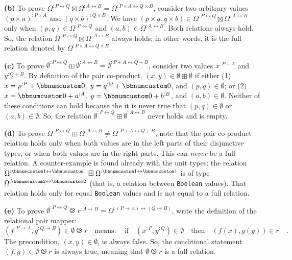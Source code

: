 \textbf{(b)} To prove $\Omega^{:P\leftrightarrow Q}\boxtimes\Omega^{:A\leftrightarrow B}=\Omega^{:P\times A\leftrightarrow Q\times B}$,
consider two arbitrary values $(p\times a)^{:P\times A}$ and $(q\times b)^{:Q\times B}$.
We have $(p\times a,q\times b)\in\Omega^{:P\leftrightarrow Q}\boxtimes\Omega^{:A\leftrightarrow B}$
only when $(p,q)\in\Omega^{:P\leftrightarrow Q}$ and $(a,b)\in\Omega^{:A\leftrightarrow B}$.
Both relations always hold. So, the relation $\Omega^{:P\leftrightarrow Q}\boxtimes\Omega^{:A\leftrightarrow B}$
always holds; in other words, it is the full relation denoted by $\Omega^{:P\times A\leftrightarrow Q\times B}$.

\textbf{(c)} To prove $\emptyset^{:P\leftrightarrow Q}\boxplus\emptyset^{:A\leftrightarrow B}=\emptyset^{:P+A\leftrightarrow Q+B}$,
consider two values $x^{:P+A}$ and $y^{:Q+B}$. By definition of
the pair co-product, $(x,y)\in\emptyset\boxplus\emptyset$ if either
(1) $x=p^{:P}+\bbnum 0$, $y=q^{:Q}+\bbnum 0$, and $(p,q)\in\emptyset$;
or (2) $x=\bbnum 0+a^{:A}$, $y=\bbnum 0+b^{:B}$, and $(a,b)\in\emptyset$.
Neither of these conditions can hold because the it is never true
that $(p,q)\in\emptyset$ or $(a,b)\in\emptyset$. So, the relation
$\emptyset^{:P\leftrightarrow Q}\boxplus\emptyset^{:A\leftrightarrow B}$
never holds and is empty.

\textbf{(d)} To prove $\Omega^{:P\leftrightarrow Q}\boxplus\Omega^{:A\leftrightarrow B}\neq\Omega^{:P+A\leftrightarrow Q+B}$,
note that the pair co-product relation holds only when both values
are in the left parts of their disjunctive types, or when both values
are in the right parts. This can \emph{never} be a full relation.
A counter-example is found already with the unit types: the relation
$\Omega^{:\bbnum 1\leftrightarrow\bbnum 1}\boxplus\Omega^{:\bbnum 1\leftrightarrow\bbnum 1}$
is of type $\Omega^{:\bbnum 2\leftrightarrow\bbnum 2}$ (that is,
a relation between \lstinline!Boolean! values). That relation holds
only for equal \lstinline!Boolean! values and is not equal to a full
relation.

\textbf{(e)} To prove $\emptyset^{:P\leftrightarrow Q}\ogreaterthan r^{:A\leftrightarrow B}=\Omega^{:(P\rightarrow A)\leftrightarrow(Q\rightarrow B)}$,
write the definition of the relational pair mapper:
\[
(f^{:P\rightarrow A},g^{:Q\rightarrow B})\in\emptyset\ogreaterthan r\quad\text{means}:\quad\text{if}\quad(x^{:P},y^{:Q})\in\emptyset\quad\text{then}\quad(f(x),g(y))\in r\quad.
\]
The precondition, $(x,y)\in\emptyset$, is always false. So, the conditional
statement $(f,g)\in\emptyset\ogreaterthan r$ is always true, meaning
that $\emptyset\ogreaterthan r$ is a full relation. 

